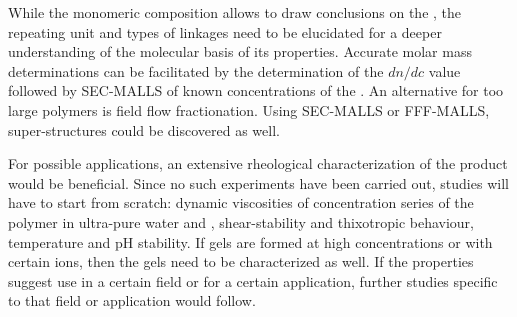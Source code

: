 While the monomeric composition allows to draw conclusions on the \eps{}, the repeating unit and types of linkages need to be elucidated for a deeper understanding of the molecular basis of its properties. Accurate molar mass determinations can be facilitated by the determination of the $dn/dc$ value followed by SEC-MALLS of known concentrations of the \eps{}. An alternative for too large polymers is field flow fractionation. Using SEC-MALLS or FFF-MALLS, super-structures could be discovered as well.

For possible applications, an extensive rheological characterization of the product would be beneficial. Since no such experiments have been carried out, studies will have to start from scratch: dynamic viscosities of concentration series of the polymer in ultra-pure water and  , shear-stability and thixotropic behaviour, temperature and pH stability. If gels are formed at high concentrations or with certain ions, then the gels need to be characterized as well. If the properties suggest use in a certain field or for a certain application, further studies specific to that field or application would follow.

